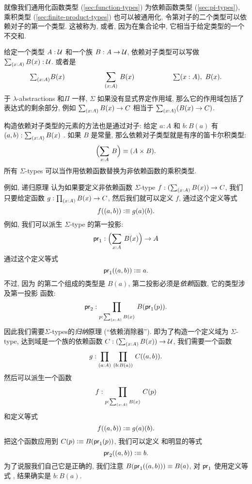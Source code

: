 %
%
%
%
%

就像我们通用化函数类型 (\cref{sec:function-types}) 为依赖函数类型 (\cref{sec:pi-types}), 乘积类型 (\cref{sec:finite-product-types}) 也可以被通用化, 令第对子的二个类型可以依赖对子的第一个类型. 这被称为, 或者, 因为在集合论中, 它相当于给定类型的一个不交和. 

给定一个类型 $A:\mathcal{U}$ 和一个族 $B : A \to \mathcal{U}$, 依赖对子类型可以写做 $\sm{x:A} B(x) : \UU$. 或者是  \[ \tsm{x:A} B(x) \hspace{2cm} \dsm{x:A}B(x) \hspace{2cm} \lsm{x:A} B(x). \]
于 $\lambda$-abstractions 和$\Pi$ 一样, $\Sigma$ 如果没有显式界定作用域, 那么它的作用域包括了表达式的剩余部分, 例如 $\sm{x:A} B(x) \to C$ 相当于 $\sm{x:A} (B(x) \to C)$.

%
%
构造依赖对子类型的元素的方法也是通过对子: 给定 $a:A$ 和 $b:B(a)$ 有 $\tup{a}{b} : \sm{x:A} B(x)$ . 如果 $B$ 是常量, 那么依赖对子类型就是有序的笛卡尔积类型: \[ \Parens{\sm{x:A} B} \jdeq (A \times B).\]
所有 $\Sigma$-types 可以当作用依赖函数替换为非依赖函数的乘积类型. 

例如, 递归原理%
认为如果要定义非依赖函数 $\Sigma$-type $f : (\sm{x:A} B(x)) \to C$, 我们只要给定函数  $g : \prd{x:A} B(x) \to C$, 然后我们就可以定义 $f$, 通过这个定义等式 \[ f((a,b)) \vcentcolon\equiv g(a)(b). \]
%
例如, 我们可以派生 $\Sigma$-type 的第一投影: %
\begin{equation*}
\fst : \Parens{\sm{x : A}B(x)} \to A
\end{equation*}
通过这个定义等式 \begin{equation*}
\mathsf{pr}_{1}((a,b)) \vcentcolon\equiv a.
\end{equation*}
不过, 因为  的第二个组成的类型是 $B(a)$, 第二投影必须是\emph{依赖}函数, 它的类型涉及第一投影 函数: %
\[ \snd : \prd{p:\sm{x : A}B(x)}B(\fst(p)). \]
因此我们需要$\Sigma$-types的\emph{归纳}原理%
 (``依赖消除器''). 即为了构造一个定义域为 $\Sigma$-type, 达到域是一个族的依赖函数 $C : (\sm{x:A} B(x)) \to \UU$, 我们需要一个函数 \[ g : \prd{a:A}{b:B(a)} C(\tup{a}{b}). \]
然后可以派生一个函数  \[ f : \prd{p : \sm{x:A}B(x)} C(p) \]
和定义等式 \[ f((a,b)) \vcentcolon\equiv g(a)(b).\]
把这个函数应用到 $C(p)\vcentcolon\equiv B(\mathsf{pr}_{1}(p))$, 我们可以定义  和明显的等式 \[ \mathsf{pr}_{2}((a,b)) \vcentcolon\equiv b. \]
为了说服我们自己它是正确的, 我们注意 $B (\mathsf{pr}_{1}((a,b))) \equiv B(a)$, 对 $\mathsf{pr}_{1}$ 使用定义等式 , 结果确实是 $b : B(a)$. 

